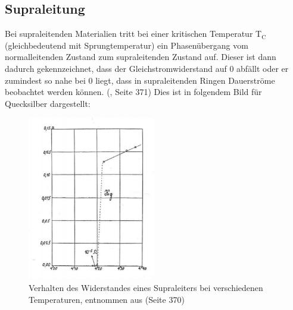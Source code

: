 \documentclass[german,  %
parskip=full,  %
]{scrartcl}
\begin{document}
\subsection{Supraleitung}
Bei supraleitenden Materialien tritt bei einer kritischen Temperatur T$_{\text{C}}$ (gleichbedeutend mit Sprungtemperatur) ein Phasenübergang vom normalleitenden Zustand zum supraleitenden Zustand auf. Dieser ist dann  dadurch gekennzeichnet, dass der Gleichstromwiderstand auf $0$ abfällt oder er zumindest so nahe bei $0$ liegt, dass in supraleitenden Ringen Dauerströme beobachtet werden können. (\cite{5}, Seite 371)
\newpage
Dies ist in folgendem Bild für Quecksilber dargestellt:
\\
\begin{figure}[h!]
\centering
\includegraphics[width=0.5\textwidth]{hg}
\caption{Verhalten des Widerstandes eines Supraleiters bei verschiedenen Temperaturen, entnommen aus \cite{5} (Seite 370)}
\end{figure}
\end{document}
